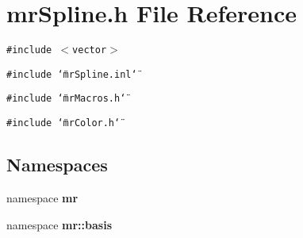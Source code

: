 \section{mr\-Spline.h File Reference}
\label{mrSpline_8h}
{\tt \#include $<$vector$>$}\par
{\tt \#include \char`\"{}mr\-Spline.inl\char`\"{}}\par
{\tt \#include \char`\"{}mr\-Macros.h\char`\"{}}\par
{\tt \#include \char`\"{}mr\-Color.h\char`\"{}}\par
\subsection*{Namespaces}
\begin{CompactItemize}
\item 
namespace {\bf mr}
\item 
namespace {\bf mr::basis}
\end{CompactItemize}
